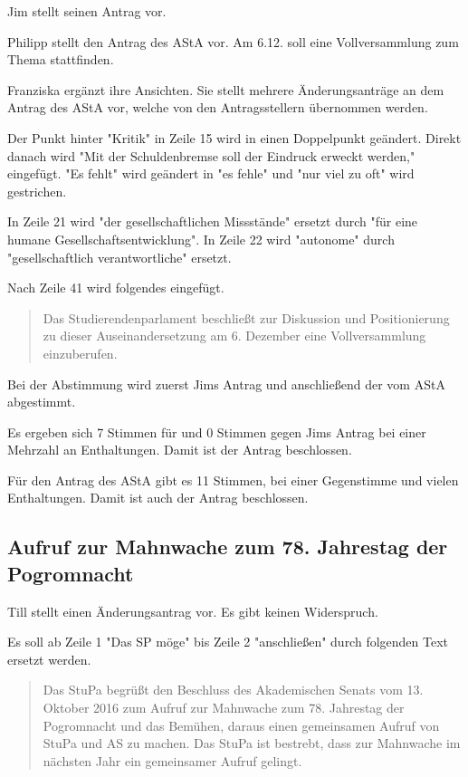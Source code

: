 \documentclass[ngerman,headheight=70pt]{scrartcl}
\begin{document}
    Jim stellt seinen Antrag vor.

    Philipp stellt den Antrag des AStA vor.
    Am 6.12. soll eine Vollversammlung zum Thema stattfinden.

    Franziska ergänzt ihre Ansichten. Sie stellt mehrere Änderungsanträge an dem
    Antrag des AStA vor, welche von den Antragsstellern übernommen werden.

    Der Punkt hinter "Kritik" in Zeile 15 wird in einen Doppelpunkt geändert.
    Direkt danach wird "Mit der Schuldenbremse soll der Eindruck erweckt werden,"
    eingefügt. "Es fehlt" wird geändert in "es fehle" und "nur viel zu oft"
    wird gestrichen.

    In Zeile 21 wird "der gesellschaftlichen Missstände" ersetzt durch "für eine
    humane Gesellschaftsentwicklung". In Zeile 22 wird "autonome" durch
    "gesellschaftlich verantwortliche" ersetzt.

    Nach Zeile 41 wird folgendes eingefügt.

    \blockquote{
        Das Studierendenparlament beschließt zur Diskussion und Positionierung
        zu dieser Auseinandersetzung am 6. Dezember eine Vollversammlung
        einzuberufen.
    }

    Bei der Abstimmung wird zuerst Jims Antrag und anschließend der vom AStA
    abgestimmt.

    Es ergeben sich 7 Stimmen für und 0 Stimmen gegen Jims Antrag bei einer
    Mehrzahl an Enthaltungen. Damit ist der Antrag beschlossen.

    Für den Antrag des AStA gibt es 11 Stimmen, bei einer Gegenstimme und vielen
    Enthaltungen. Damit ist auch der Antrag beschlossen.

    \subsection{Aufruf zur Mahnwache zum 78. Jahrestag der Pogromnacht}

    Till stellt einen Änderungsantrag vor. Es gibt keinen Widerspruch.

    Es soll ab Zeile 1 "Das SP möge" bis Zeile 2 "anschließen" durch folgenden
    Text ersetzt werden.

    \blockquote{
        Das StuPa begrüßt den Beschluss des Akademischen Senats vom 13. Oktober
        2016 zum Aufruf zur Mahnwache zum 78. Jahrestag der Pogromnacht und das
        Bemühen, daraus einen gemeinsamen Aufruf von StuPa und AS zu machen.
        Das StuPa ist bestrebt, dass zur Mahnwache im nächsten Jahr ein gemeinsamer
        Aufruf gelingt.
    }
\end{document}
